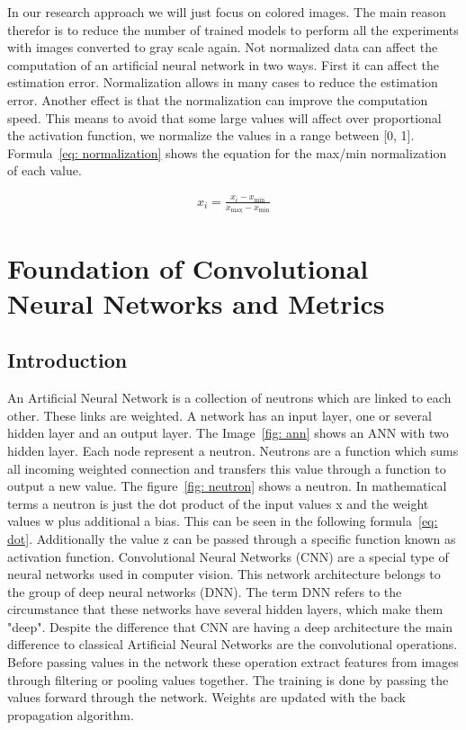 \documentclass[11pt, a4paper]{article}
\begin{document}
In our research approach we will just focus on colored images. The main reason therefor is to reduce the number of trained models to perform all the experiments with images converted to gray scale again. 
Not normalized data can affect the computation of an artificial neural network in two ways. First it can affect the estimation error. Normalization allows in many cases to reduce the estimation error. Another effect is that the normalization can improve the computation speed.\cite[p.~316 - 318]{UML} This means to avoid that some large values will affect over proportional the activation function, we normalize the values in a range between [0, 1]. Formula~\ref{eq: normalization} shows the equation for the max/min normalization of each value.

\begin{center}
\begin{eqnarray}
x_{i} = \frac{x_{i} - x_{\min}}{x_{\max} - x_{\min}}
\end{eqnarray}
\label{eq: normalization}
\end{center}

\section{Foundation of Convolutional Neural Networks and Metrics}

\subsection{Introduction}

An Artificial Neural Network is a collection of neutrons which are linked to each other. These links are weighted. A network has an input layer, one or several hidden layer and an output layer. The Image~\ref{fig: ann} shows an ANN with two hidden layer. Each node represent a neutron. Neutrons are a function which sums all incoming weighted connection and transfers this value through a function to output a new value.\cite[p.~91-92]{IntroML}
The figure~\ref{fig: neutron} shows a neutron. In mathematical terms a neutron is just the dot product of the input values x and the weight values w plus additional a bias. This can be seen in the following formula~\ref{eq: dot}. Additionally the value z can be passed through a specific function known as activation function.
Convolutional Neural Networks (CNN) are a special type of neural networks used in computer vision. This network architecture belongs to the group of deep neural networks (DNN). The term DNN refers to the circumstance that these networks have several hidden layers, which make them "deep".\cite{CNNmath} Despite the difference that CNN are having a deep architecture the main difference to classical Artificial Neural Networks are the convolutional operations. Before passing values in the network these operation extract features from images through filtering or pooling values together.\cite{CNNover}
The training is done by passing the values forward through the network.\cite[p.~93]{IntroML} Weights are updated with the back propagation algorithm.~\cite{backprop}
\end{document}
